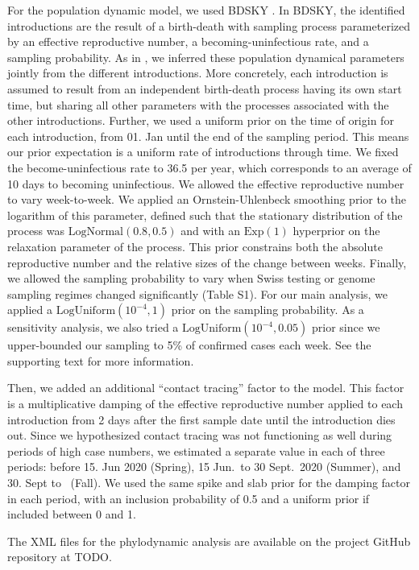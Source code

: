 \documentclass[11pt,twoside,lineno]{pnas-new} %
\begin{document}
For the population dynamic model, we used BDSKY \cite{stadler2013birth}. In BDSKY, the identified introductions are the result of a birth-death with sampling process parameterized by an effective reproductive number, a becoming-uninfectious rate, and a sampling probability. As in \cite{Muller2020}, we inferred these population dynamical parameters jointly from the different introductions. More concretely, each introduction is assumed to result from an independent birth-death process having its own start time, but sharing all other parameters with the processes associated with the other introductions. 
Further, we used a uniform prior on the time of origin for each introduction, from 01. Jan until the end of the sampling period. This means our prior expectation is a uniform rate of introductions through time. We fixed the become-uninfectious rate to 36.5 per year, which corresponds to an average of 10 days to becoming uninfectious. We allowed the effective reproductive number to vary week-to-week. We applied an Ornstein-Uhlenbeck smoothing prior to the logarithm of this parameter, defined such that the stationary distribution of the process was $\text{LogNormal}(0.8, 0.5)$  and with an $\text{Exp}(1)$ hyperprior on the relaxation parameter of the process. This prior constrains both the absolute reproductive number and the relative sizes of the change between weeks. Finally, we allowed the sampling probability to vary when Swiss testing or genome sampling regimes changed significantly (Table S1). For our main analysis, we applied a $\text{LogUniform}(10^{-4}, 1)$ prior on the sampling probability. As a sensitivity analysis, we also tried a $\text{LogUniform}(10^{-4}, 0.05)$ prior since we upper-bounded our sampling to 5\% of confirmed cases each week. See the supporting text for more information.

Then, we added an additional ``contact tracing'' factor to the model. This factor is a multiplicative damping of the effective reproductive number applied to each introduction from 2 days after the first sample date until the introduction dies out. Since we hypothesized contact tracing was not functioning as well during periods of high case numbers, we estimated a separate value in each of three periods: before 15. Jun 2020 (Spring), 15 Jun.~to 30 Sept.~2020 (Summer), and 30. Sept to \maxdate\ (Fall). We used the same spike and slab prior for the damping factor in each period, with an inclusion probability of 0.5 and a uniform prior if included between 0 and 1. 

The XML files for the phylodynamic analysis are available on the project GitHub repository at TODO.
\end{document}
